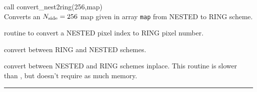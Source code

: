 \begin{example}
{
call convert\_nest2ring(256,map)  \\
}
{
Converts an $N_{\mathrm{side}}=256$ map given in array {\tt map} from NESTED to RING scheme.
}
\end{example}

\begin{modules}
  \begin{sulist}{} %
 \item[\htmlref{nest2ring}{sub:pix_tools}] routine to convert a NESTED pixel index to RING pixel number.		
  \end{sulist}
\end{modules}
\begin{related}
  \begin{sulist}{} %
  \item[\htmlref{convert\_ring2nest}{sub:convert_ring2nest}] convert between RING and NESTED schemes.
  \item[\htmlref{convert\_inplace}{sub:convert_inplace}] convert between NESTED
    and RING schemes inplace. This routine is slower than \thedocid, but doesn't require as much memory.
  \end{sulist}
\end{related}

\rule{\hsize}{2mm}

\newpage
